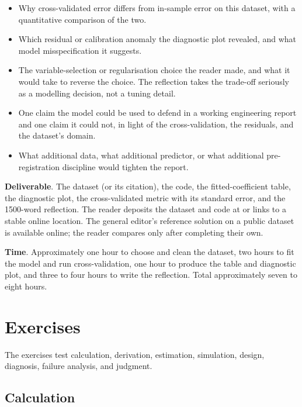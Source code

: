 \begin{project}
\begin{itemize}[leftmargin=*]
  \item Why cross-validated error differs from in-sample error on
    this dataset, with a quantitative comparison of the two.
  \item Which residual or calibration anomaly the diagnostic plot
    revealed, and what model misspecification it suggests.
  \item The variable-selection or regularisation choice the reader
    made, and what it would take to reverse the choice. The
    reflection takes the trade-off seriously as a modelling
    decision, not a tuning detail.
  \item One claim the model could be used to defend in a working
    engineering report and one claim it could not, in light of
    the cross-validation, the residuals, and the dataset's
    domain.
  \item What additional data, what additional predictor, or what
    additional pre-registration discipline would tighten the
    report.
\end{itemize}

\textbf{Deliverable}. The dataset (or its citation), the code, the
fitted-coefficient table, the diagnostic plot, the cross-validated
metric with its standard error, and the 1500-word reflection. The
reader deposits the dataset and code at 
or links to a stable online location. The general editor's
reference solution on a public dataset is available online; the
reader compares only after completing their own.

\textbf{Time}. Approximately one hour to choose and clean the
dataset, two hours to fit the model and run cross-validation, one
hour to produce the table and diagnostic plot, and three to four
hours to write the reflection. Total approximately seven to eight
hours.
\end{project}

\section{Exercises}

The exercises test calculation, derivation, estimation, simulation,
design, diagnosis, failure analysis, and judgment.

\subsection*{Calculation}

